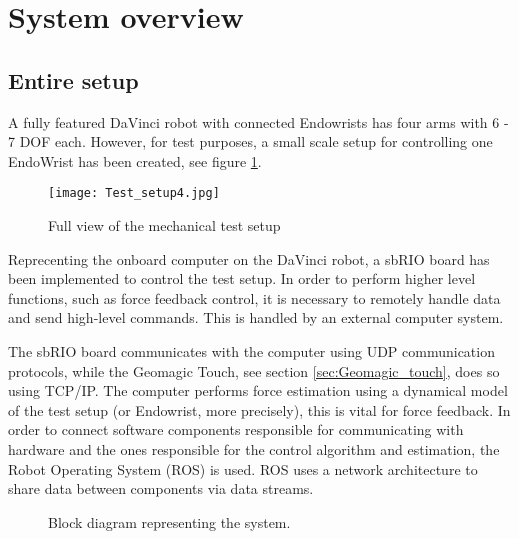 \section{System overview}\label{sec:system_overview}

\subsection{Entire setup}

A fully featured DaVinci robot with connected Endowrists has four arms with 6 - 7 DOF each. 
However, for test purposes, a small scale setup for controlling one EndoWrist has been created, see figure \ref{fig:Mec_d}.

\begin{figure}
    \centering
    \texttt{[image: Test\_setup4.jpg]}
    \caption{Full view of the mechanical test setup}
    \label{fig:Mec_d}
\end{figure}

Reprecenting the onboard computer on the DaVinci robot, a sbRIO board has been implemented to control the test setup. 
In order to perform higher level functions, such as force feedback control, it is necessary to remotely handle data and send high-level commands.
This is handled by an external computer system. %

The sbRIO board communicates with the computer using UDP  communication protocols, while the Geomagic Touch, see section \ref{sec:Geomagic_touch}, does so using TCP/IP.
The computer performs force estimation using a dynamical model of the test setup (or Endowrist, more precisely), this is vital for force feedback.
In order to connect software components responsible for communicating with hardware and the ones responsible for the control algorithm and estimation, the Robot Operating System (ROS) is used.
ROS uses a network architecture to share data between components via data streams.


\begin{figure}[h]
\centering
{}
\caption{Block diagram representing the system.}
\end{figure}


